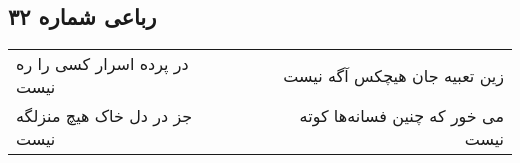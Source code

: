 \begin{center}
\section*{رباعی شماره ۳۲}
\label{sec:sh032}
\begin{longtable}{l p{0.5cm} r}
در پرده اسرار کسی را ره نیست
&&
زین تعبیه جان هیچکس آگه نیست
\\
جز در دل خاک هیچ منزلگه نیست
&&
می خور که چنین فسانه‌ها کوته نیست
\\
\end{longtable}
\end{center}

